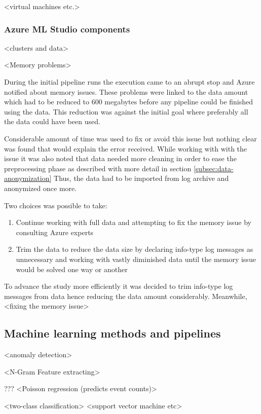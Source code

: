 \documentclass[english, 12pt, a4paper, elec, utf8, a-1b, online]{aaltothesis}
\begin{document}
<virtual machines etc.>




\subsubsection*{Azure ML Studio components}
<clusters and data>

<Memory problems>

During the initial pipeline runs
the execution came to an abrupt stop
and Azure notified about memory issues.
These problems were linked to the data amount
which had to be reduced to 600 megabytes
before any pipeline could be finished using the data.
This reduction was against the initial goal
where preferably all the data could have been used.

Considerable amount of time was used
to fix or avoid this issue
but nothing clear was found
that would explain the error received.
While working with with the issue
it was also noted
that data needed more cleaning
in order to ease the preprocessing phase
as described with more detail in section \ref{subsec:data-anonymization}
Thus,
the data had to be imported from log archive
and anonymized once more.

Two choices was possible to take:
\begin{enumerate}
  \item Continue working with full data
  and attempting to fix the memory issue
  by consulting Azure experts
  \item  Trim the data to reduce the data size
  by declaring info-type log messages
  as unnecessary
  and working with vastly diminished data
  until the memory issue would be solved
  one way or another
\end{enumerate}

To advance the study more efficiently
it was decided to trim info-type log messages from data
hence reducing the data amount considerably.
Meanwhile,
<fixing the memory issue>

\subsection{Machine learning methods and pipelines}\label{subsec:machine-learning-methods-and-pipelines}

<anomaly detection>

<N-Gram Feature extracting>

???
<Poisson regression (predicts event counts)>

<two-class classification>
<support vector machine etc>
\end{document}

